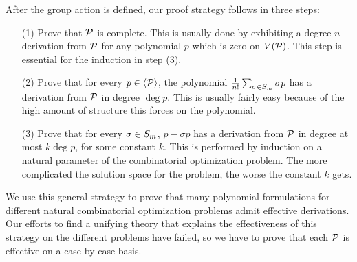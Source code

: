 After the group action is defined, our proof strategy follows in three steps:
\begin{enumerate}
\item[(1)] Prove that $\mathcal P$ is complete. This is usually done by exhibiting a degree $n$ derivation from $\mathcal P$ for any polynomial $p$ which is zero on $V(\mathcal P)$. This step is essential for the induction in step (3). 
\item[(2)] Prove that for every $p \in \langle \mathcal P \rangle$, the polynomial $\frac{1}{n!} \sum_{\sigma \in S_{m}} \sigma p$ has a derivation from $\mathcal P$ in degree $\deg p$. This is usually fairly easy because of the high amount of structure this forces on the polynomial. 
\item[(3)] Prove that for every $\sigma \in S_{m}$, $p - \sigma p$ has a derivation from $\mathcal P$ in degree at most $k \deg p$, for some constant $k$. This is performed by induction on a natural parameter of the combinatorial optimization problem. The more complicated the solution space for the problem, the worse the constant $k$ gets. 
\end{enumerate}
We use this general strategy to prove that many polynomial formulations for different natural combinatorial optimization problems admit effective derivations. 
Our efforts to find a unifying theory that explains the effectiveness of this strategy on the different problems have failed, so we have to prove that each $\mathcal P$ is effective on a case-by-case basis.  

